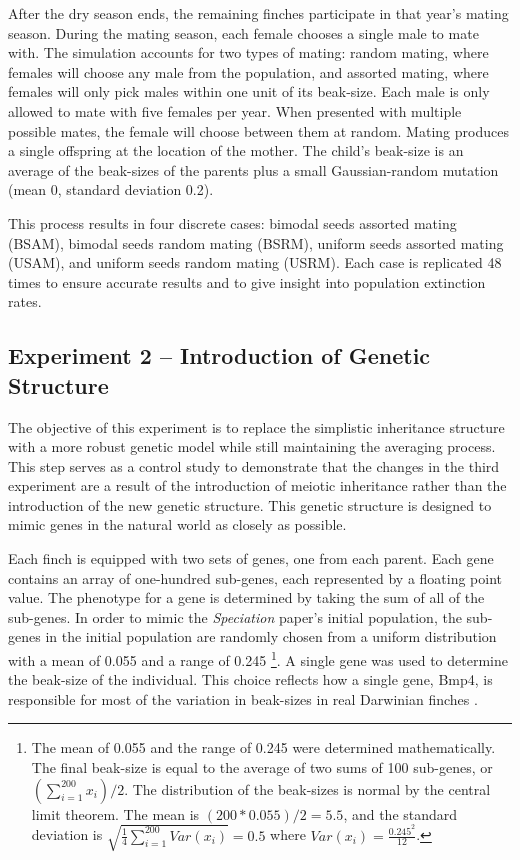 \documentclass{article}
\begin{document}
After the dry season ends, the remaining finches participate in that year's mating season. During the mating season, each female chooses a single male to mate with. The simulation accounts for two types of mating: random mating, where females will choose any male from the population, and assorted mating, where females will only pick males within one unit of its beak-size. Each male is only allowed to mate with five females per year. When presented with multiple possible mates, the female will choose between them at random. Mating produces a single offspring at the location of the mother. The child’s beak-size is an average of the beak-sizes of the parents plus a small Gaussian-random mutation (mean 0, standard deviation 0.2).

This process results in four discrete cases: bimodal seeds assorted mating (BSAM), bimodal seeds random mating (BSRM), uniform seeds assorted mating (USAM), and uniform seeds random mating (USRM). Each case is replicated 48 times to ensure accurate results and to give insight into population extinction rates. 



\subsection{Experiment 2 -- Introduction of Genetic Structure}

The objective of this experiment is to replace the simplistic inheritance structure with a more robust genetic model while still maintaining the averaging process. This step serves as a control study to demonstrate that the changes in the third experiment are a result of the introduction of meiotic inheritance rather than the introduction of the new genetic structure. This genetic structure is designed to mimic genes in the natural world as closely as possible.

Each finch is equipped with two sets of genes, one from each parent. Each gene contains an array of one-hundred sub-genes, each represented by a floating point value. The phenotype for a gene is determined by taking the sum of all of the sub-genes. In order to mimic the \textit{Speciation} paper’s initial population, the sub-genes in the initial population are randomly chosen from a uniform distribution with a mean of 0.055 and a range of 0.245 \footnote{The mean of 0.055 and the range of 0.245 were determined mathematically. The final beak-size is equal to the average of two sums of 100 sub-genes, or $(\sum_{i=1}^{200} x_{i})/2$. The distribution of the beak-sizes is normal by the central limit theorem. The mean is $(200 * 0.055)/2 = 5.5$, and the standard deviation is $\sqrt{\frac{1}{4}\sum_{i=1}^{200}Var(x_{i})} = 0.5$ where $Var(x_{i}) = \frac{0.245^2}{12}$.}. A single gene was used to determine the beak-size of the individual. This choice reflects how a single gene, Bmp4, is responsible for most of the variation in beak-sizes in real Darwinian finches \cite{BMP4}. 
\end{document}
